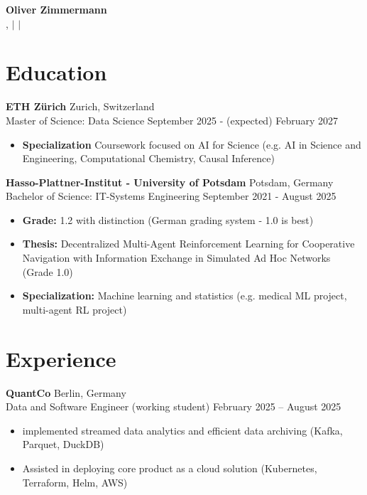 \documentclass[10pt, a4paper]{article}
\begin{document}
\begin{center}
    {\LARGE \textbf{Oliver Zimmermann}} \\
    \vspace{2pt}
    \city, \country \(\mid\) \phone \(\mid\) \email \\
\end{center}

\section*{Education}

\textbf{ETH Zürich} \hfill Zurich, Switzerland \\
Master of Science: Data Science \hfill September 2025 - (expected) February 2027
\begin{itemize}[noitemsep, topsep=0pt]
    \item \textbf{Specialization} Coursework focused on AI for Science (e.g. AI in Science and Engineering, Computational Chemistry, Causal Inference)
\end{itemize}

\textbf{Hasso-Plattner-Institut - University of Potsdam} \hfill Potsdam, Germany \\
Bachelor of Science: IT-Systems Engineering \hfill September 2021 - August 2025
\begin{itemize}[noitemsep, topsep=0pt]
    \item \textbf{Grade:} 1.2 with distinction (German grading system - 1.0 is best)
    \item \textbf{Thesis:} Decentralized Multi-Agent Reinforcement Learning for Cooperative Navigation with
Information Exchange in Simulated Ad Hoc Networks (Grade 1.0)
    \item \textbf{Specialization:} Machine learning and statistics (e.g. medical ML project, multi-agent RL project)
\end{itemize}

\section*{Experience}

\textbf{QuantCo} \hfill Berlin, Germany \\
Data and Software Engineer (working student) \hfill February 2025 -- August 2025
\begin{itemize}[noitemsep, topsep=0pt]
    \item implemented streamed data analytics and efficient data archiving (Kafka, Parquet, DuckDB)
    \item Assisted in deploying core product as a cloud solution (Kubernetes, Terraform, Helm, AWS)
\end{itemize}
\end{document}
